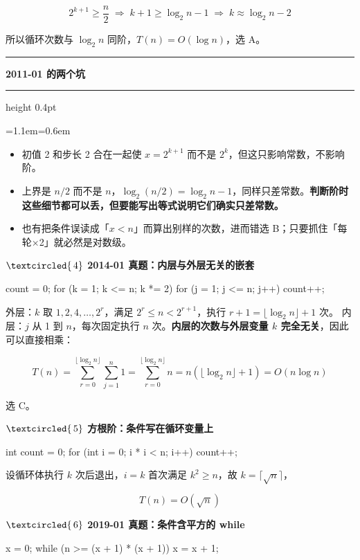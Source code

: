 \documentclass[11pt,openany,UTF8]{ctexbook}
\newcommand{\circled}[1]{\textcircled{\scriptsize\,#1}}
\newcommand{\callouthead}[2]{%
  \par\addvspace{7pt}\noindent
  {\color{#1}\rule[-0.15em]{3pt}{1.05em}}\hspace{0.5em}%
  {\bfseries\color{#1}#2}\par\nobreak\vspace{-0.35em}%
  {\color{rulesep}\hrule height 0.4pt}\nobreak\vspace{0.45em}%
  \begingroup\small\setlength{\parindent}{0pt}%
  \leftskip=1.1em\rightskip=0.6em\noindent\ignorespaces}
\newcommand{\calloutend}{\par\endgroup\addvspace{7pt}}
\newenvironment{callwarn}[1]{\callouthead{warnbar}{#1}}{\calloutend}
\begin{document}
\[2^{k+1} \ge \frac{n}{2} \;\Longrightarrow\; k+1 \ge \log_2 n - 1 \;\Longrightarrow\; k \approx \log_2 n - 2\]

所以循环次数与 $\log_2 n$ 同阶，$T(n)=O(\log n)$，选 A。

\begin{callwarn}{2011-01 的两个坑}
\begin{itemize}
\item 初值 2 和步长 2 合在一起使 $x = 2^{k+1}$ 而不是 $2^k$，但这只影响常数，不影响阶。
\item 上界是 $n/2$ 而不是 $n$，$\log_2(n/2)=\log_2 n - 1$，同样只差常数。\textbf{判断阶时这些细节都可以丢，但要能写出等式说明它们确实只差常数。}
\item 也有把条件误读成「$x < n$」而算出别样的次数，进而错选 B；只要抓住「每轮$\times$2」就必然是对数级。
\end{itemize}
\end{callwarn}

\textbf{$\circled{4}$ 2014-01 真题：内层与外层无关的嵌套}

\begin{codebox}
count = 0;
for (k = 1; k <= n; k *= 2)
    for (j = 1; j <= n; j++)
        count++;
\end{codebox}

外层：$k$ 取 $1,2,4,\dots,2^{r}$，满足 $2^r \le n < 2^{r+1}$，执行 $r+1 = \lfloor\log_2 n\rfloor+1$ 次。 内层：$j$ 从 1 到 $n$，每次固定执行 $n$ 次。\textbf{内层的次数与外层变量 $k$ 完全无关}，因此可以直接相乘：

\[T(n)=\sum_{r=0}^{\lfloor \log_2 n\rfloor}\sum_{j=1}^{n}1 = \sum_{r=0}^{\lfloor \log_2 n\rfloor} n = n(\lfloor\log_2 n\rfloor+1)=O(n\log n)\]

选 C。

\textbf{$\circled{5}$ 方根阶：条件写在循环变量上}

\begin{codebox}
int count = 0;
for (int i = 0; i * i < n; i++)
    count++;
\end{codebox}

设循环体执行 $k$ 次后退出，$i = k$ 首次满足 $k^2 \ge n$，故 $k = \lceil \sqrt{n}\rceil$，

\[T(n)=O(\sqrt{n})\]

\textbf{$\circled{6}$ 2019-01 真题：条件含平方的 while}

\begin{codebox}
x = 0;
while (n >= (x + 1) * (x + 1))
    x = x + 1;
\end{codebox}
\end{document}
